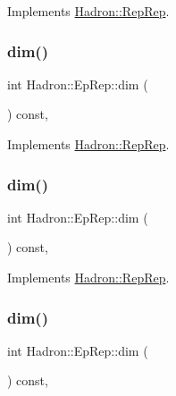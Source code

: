 Implements \mbox{\hyperlink{structHadron_1_1RepRep_a92c8802e5ed7afd7da43ccfd5b7cd92b}{Hadron\+::\+Rep\+Rep}}.

\mbox{\label{structHadron_1_1EpRep_a1c0d8b8924b0bb66325c1049fc6cd76e}} 
\subsubsection{\texorpdfstring{dim()}{dim()}\hspace{0.1cm}{\footnotesize\ttfamily [3/5]}}
{\footnotesize\ttfamily int Hadron\+::\+Ep\+Rep\+::dim (\begin{DoxyParamCaption}{ }\end{DoxyParamCaption}) const\hspace{0.3cm}{\ttfamily [inline]}, {\ttfamily [virtual]}}



Implements \mbox{\hyperlink{structHadron_1_1RepRep_a92c8802e5ed7afd7da43ccfd5b7cd92b}{Hadron\+::\+Rep\+Rep}}.

\mbox{\label{structHadron_1_1EpRep_a1c0d8b8924b0bb66325c1049fc6cd76e}} 
\subsubsection{\texorpdfstring{dim()}{dim()}\hspace{0.1cm}{\footnotesize\ttfamily [4/5]}}
{\footnotesize\ttfamily int Hadron\+::\+Ep\+Rep\+::dim (\begin{DoxyParamCaption}{ }\end{DoxyParamCaption}) const\hspace{0.3cm}{\ttfamily [inline]}, {\ttfamily [virtual]}}



Implements \mbox{\hyperlink{structHadron_1_1RepRep_a92c8802e5ed7afd7da43ccfd5b7cd92b}{Hadron\+::\+Rep\+Rep}}.

\mbox{\label{structHadron_1_1EpRep_a1c0d8b8924b0bb66325c1049fc6cd76e}} 
\subsubsection{\texorpdfstring{dim()}{dim()}\hspace{0.1cm}{\footnotesize\ttfamily [5/5]}}
{\footnotesize\ttfamily int Hadron\+::\+Ep\+Rep\+::dim (\begin{DoxyParamCaption}{ }\end{DoxyParamCaption}) const\hspace{0.3cm}{\ttfamily [inline]}, {\ttfamily [virtual]}}



